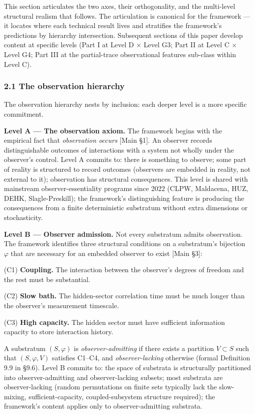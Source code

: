 \documentclass[
]{article}
\begin{document}
This section articulates the two axes, their orthogonality, and the
multi-level structural realism that follows. The articulation is
canonical for the framework --- it locates where each technical result
lives and stratifies the framework's predictions by hierarchy
intersection. Subsequent sections of this paper develop content at
specific levels (Part I at Level D × Level G3; Part II at Level C ×
Level G4; Part III at the partial-trace observational features sub-class
within Level C).

\hypertarget{the-observation-hierarchy}{%
\subsubsection{2.1 The observation
hierarchy}\label{the-observation-hierarchy}}

The observation hierarchy nests by inclusion: each deeper level is a
more specific commitment.

\textbf{Level A --- The observation axiom.} The framework begins with
the empirical fact that \emph{observation occurs} {[}Main §1{]}. An
observer records distinguishable outcomes of interactions with a system
not wholly under the observer's control. Level A commits to: there is
something to observe; some part of reality is structured to record
outcomes (observers are embedded in reality, not external to it);
observation has structural consequences. This level is shared with
mainstream observer-essentiality programs since 2022 (CLPW, Maldacena,
HUZ, DEHK, Slagle-Preskill); the framework's distinguishing feature is
producing the consequences from a finite deterministic substratum
without extra dimensions or stochasticity.

\textbf{Level B --- Observer admission.} Not every substratum admits
observation. The framework identifies three structural conditions on a
substratum's bijection \(\varphi\) that are necessary for an embedded
observer to exist {[}Main §3{]}:

(C1) \textbf{Coupling.} The interaction between the observer's degrees
of freedom and the rest must be substantial.

(C2) \textbf{Slow bath.} The hidden-sector correlation time must be much
longer than the observer's measurement timescale.

(C3) \textbf{High capacity.} The hidden sector must have sufficient
information capacity to store interaction history.

A substratum \((S, \varphi)\) is \emph{observer-admitting} if there
exists a partition \(V \subset S\) such that \((S, \varphi, V)\)
satisfies C1--C4, and \emph{observer-lacking} otherwise (formal
Definition 9.9 in §9.6). Level B commits to: the space of substrata is
structurally partitioned into observer-admitting and observer-lacking
subsets; most substrata are observer-lacking (random permutations on
finite sets typically lack the slow-mixing, sufficient-capacity,
coupled-subsystem structure required); the framework's content applies
only to observer-admitting substrata.
\end{document}
